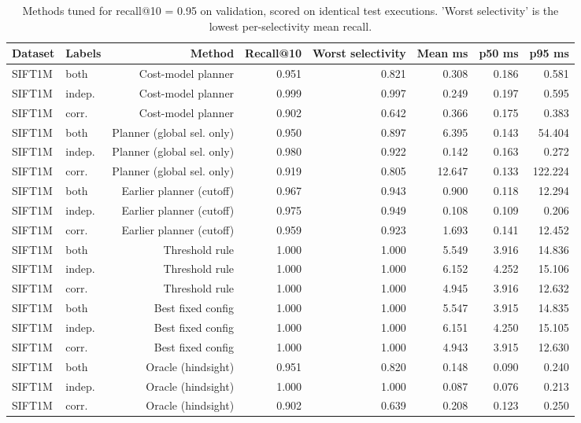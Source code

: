 \begin{table}[t]
\centering\small
\caption{Methods tuned for recall@10 = 0.95 on validation, scored on identical test executions. 'Worst selectivity' is the lowest per-selectivity mean recall.}
\label{tab:matched_recall_095}
\begin{tabular}{llrrrrrr}
\toprule
Dataset & Labels & Method & Recall@10 & Worst selectivity & Mean ms & p50 ms & p95 ms \\
\midrule
SIFT1M & both & Cost-model planner & 0.951 & 0.821 & 0.308 & 0.186 & 0.581 \\
SIFT1M & indep. & Cost-model planner & 0.999 & 0.997 & 0.249 & 0.197 & 0.595 \\
SIFT1M & corr. & Cost-model planner & 0.902 & 0.642 & 0.366 & 0.175 & 0.383 \\
SIFT1M & both & Planner (global sel. only) & 0.950 & 0.897 & 6.395 & 0.143 & 54.404 \\
SIFT1M & indep. & Planner (global sel. only) & 0.980 & 0.922 & 0.142 & 0.163 & 0.272 \\
SIFT1M & corr. & Planner (global sel. only) & 0.919 & 0.805 & 12.647 & 0.133 & 122.224 \\
SIFT1M & both & Earlier planner (cutoff) & 0.967 & 0.943 & 0.900 & 0.118 & 12.294 \\
SIFT1M & indep. & Earlier planner (cutoff) & 0.975 & 0.949 & 0.108 & 0.109 & 0.206 \\
SIFT1M & corr. & Earlier planner (cutoff) & 0.959 & 0.923 & 1.693 & 0.141 & 12.452 \\
SIFT1M & both & Threshold rule & 1.000 & 1.000 & 5.549 & 3.916 & 14.836 \\
SIFT1M & indep. & Threshold rule & 1.000 & 1.000 & 6.152 & 4.252 & 15.106 \\
SIFT1M & corr. & Threshold rule & 1.000 & 1.000 & 4.945 & 3.916 & 12.632 \\
SIFT1M & both & Best fixed config & 1.000 & 1.000 & 5.547 & 3.915 & 14.835 \\
SIFT1M & indep. & Best fixed config & 1.000 & 1.000 & 6.151 & 4.250 & 15.105 \\
SIFT1M & corr. & Best fixed config & 1.000 & 1.000 & 4.943 & 3.915 & 12.630 \\
SIFT1M & both & Oracle (hindsight) & 0.951 & 0.820 & 0.148 & 0.090 & 0.240 \\
SIFT1M & indep. & Oracle (hindsight) & 1.000 & 1.000 & 0.087 & 0.076 & 0.213 \\
SIFT1M & corr. & Oracle (hindsight) & 0.902 & 0.639 & 0.208 & 0.123 & 0.250 \\

\end{tabular}
\end{table}
